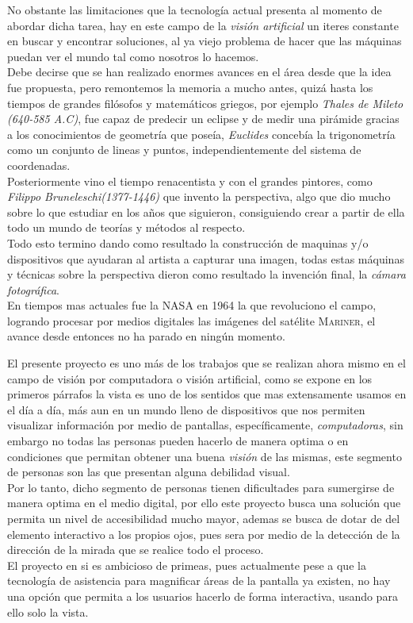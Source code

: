 \documentclass[12pt]{book} %
\begin{document}
	No obstante las limitaciones que la tecnología actual presenta al momento de abordar dicha tarea, hay en este campo de la
	\textit{visión artificial} un iteres constante en buscar y encontrar soluciones, al ya viejo problema de hacer que las 
	máquinas puedan ver el mundo tal como nosotros lo hacemos.\\
	Debe decirse que se han realizado enormes avances en el área 
	desde que la idea fue propuesta, pero remontemos la memoria a mucho antes, quizá hasta los tiempos 
	de grandes filósofos y matemáticos griegos, por ejemplo \textit{Thales de Mileto (640-585 A.C)}, fue capaz de predecir un 
	eclipse y de medir una pirámide gracias a los conocimientos de geometría que poseía,
	\textit{Euclides} concebía la trigonometría como un conjunto de lineas y puntos, independientemente del sistema de coordenadas.\\
	Posteriormente vino el tiempo renacentista y con el grandes pintores, como \textit{Filippo Bruneleschi(1377-1446)} que invento
	la perspectiva, algo que dio mucho sobre lo que estudiar en los años que siguieron, consiguiendo crear a partir de ella todo
	un mundo de teorías y métodos al respecto.\\
	Todo esto termino dando como resultado la construcción de maquinas y/o dispositivos que ayudaran al artista a capturar una 
	imagen, todas estas máquinas y técnicas sobre la perspectiva dieron como resultado la invención final, 
	la \textit{cámara fotográfica}.\\
	En tiempos mas actuales fue la \textsc{NASA} en 1964 la que revoluciono el campo, logrando procesar por medios digitales
	las imágenes del satélite \textsc{Mariner}, el avance desde entonces no ha parado en ningún momento.
	
	El presente proyecto es uno más de los trabajos que se realizan ahora mismo en el campo de visión por computadora o visión 
	artificial, como se expone en los primeros párrafos la vista es uno de los sentidos que mas extensamente usamos en el día a día,
	más aun en un mundo lleno de dispositivos que nos permiten visualizar información por medio de pantallas, específicamente,
	\textit{computadoras}, sin embargo no todas las personas pueden hacerlo de manera optima o en condiciones que permitan 
	obtener una buena \textit{visión} de las mismas, este segmento de personas son las que presentan alguna debilidad visual.\\
	Por lo tanto, dicho segmento de personas tienen dificultades para sumergirse de manera optima en el medio digital, por ello
	este proyecto busca una solución que permita un nivel de accesibilidad mucho mayor, ademas se busca de dotar de del elemento 
	interactivo a los propios ojos, pues sera por medio de la detección de la dirección de la mirada que se realice todo el proceso.\\	
	El proyecto en si es ambicioso de primeas, pues actualmente pese a que la tecnología de asistencia para magnificar áreas de la
	pantalla ya existen, no hay una opción que permita a los usuarios hacerlo de forma interactiva, usando para ello solo la vista.\\
	
\end{document}
